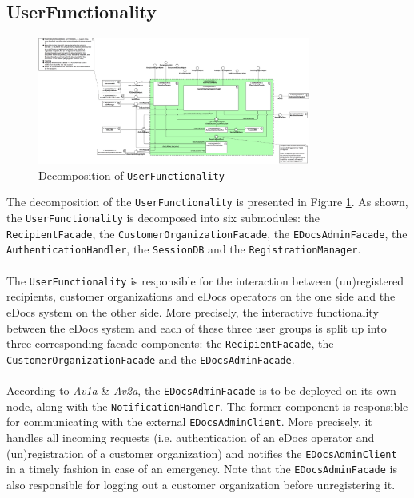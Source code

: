 \documentclass[a4paper,10pt]{article}
\begin{document}
\subsection{UserFunctionality}\label{subsec:decomp-UserFunctionality}
\begin{figure}[!htp]
	\centering
	\includegraphics[width=0.8\textwidth]{UserFunctionality.png}
	\caption{Decomposition of \texttt{UserFunctionality}}
	\label{fig:decomp-UserFunctionality}
\end{figure}
\FloatBarrier
\noindent
The decomposition of the \texttt{UserFunctionality} is presented in Figure \ref{fig:decomp-UserFunctionality}. As shown, the \texttt{UserFunctionality} is decomposed into six submodules: the \texttt{RecipientFacade}, the \texttt{CustomerOrganizationFacade}, the \texttt{EDocsAdminFacade}, the \texttt{AuthenticationHandler}, the \texttt{SessionDB} and the \texttt{RegistrationManager}.\\\\
The \texttt{UserFunctionality} is responsible for the interaction between (un)registered recipients, customer organizations and eDocs operators on the one side and the eDocs system on the other side. More precisely, the interactive functionality between the eDocs system and each of these three user groups is split up into three corresponding facade components: the \texttt{RecipientFacade}, the \texttt{CustomerOrganizationFacade} and the \texttt{EDocsAdminFacade}.\\\\
According to \textit{Av1a} \& \textit{Av2a}, the \texttt{EDocsAdminFacade} is to be deployed on its own node, along with the \texttt{NotificationHandler}. The former component is responsible for communicating with the external \texttt{EDocsAdminClient}. More precisely, it handles all incoming requests (i.e. authentication of an eDocs operator and (un)registration of a customer organization) and notifies the \texttt{EDocsAdminClient} in a timely fashion in case of an emergency. Note that the \texttt{EDocsAdminFacade} is also responsible for logging out a customer organization before unregistering it.\\\\
\end{document}
